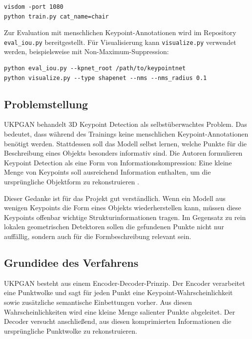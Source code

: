 \documentclass[11pt,a4paper]{article}
\begin{document}
\begin{lstlisting}
visdom -port 1080
python train.py cat_name=chair
\end{lstlisting}

Zur Evaluation mit menschlichen Keypoint-Annotationen wird im Repository \texttt{eval\_iou.py} bereitgestellt. Für Visualisierung kann \texttt{visualize.py} verwendet werden, beispielsweise mit Non-Maximum-Suppression:

\begin{lstlisting}
python eval_iou.py --kpnet_root /path/to/keypointnet
python visualize.py --type shapenet --nms --nms_radius 0.1
\end{lstlisting}

\subsection{Problemstellung}

UKPGAN behandelt 3D Keypoint Detection als selbstüberwachtes Problem. Das bedeutet, dass während des Trainings keine menschlichen Keypoint-Annotationen benötigt werden. Stattdessen soll das Modell selbst lernen, welche Punkte für die Beschreibung eines Objekts besonders informativ sind. Die Autoren formulieren Keypoint Detection als eine Form von Informationskompression: Eine kleine Menge von Keypoints soll ausreichend Information enthalten, um die ursprüngliche Objektform zu rekonstruieren \cite{you2022ukpgan}.

Dieser Gedanke ist für das Projekt gut verständlich. Wenn ein Modell aus wenigen Keypoints die Form eines Objekts wiederherstellen kann, müssen diese Keypoints offenbar wichtige Strukturinformationen tragen. Im Gegensatz zu rein lokalen geometrischen Detektoren sollen die gefundenen Punkte nicht nur auffällig, sondern auch für die Formbeschreibung relevant sein.

\subsection{Grundidee des Verfahrens}

UKPGAN besteht aus einem Encoder-Decoder-Prinzip. Der Encoder verarbeitet eine Punktwolke und sagt für jeden Punkt eine Keypoint-Wahrscheinlichkeit sowie zusätzliche semantische Einbettungen vorher. Aus diesen Wahrscheinlichkeiten wird eine kleine Menge salienter Punkte abgeleitet. Der Decoder versucht anschließend, aus diesen komprimierten Informationen die ursprüngliche Punktwolke zu rekonstruieren.
\end{document}

